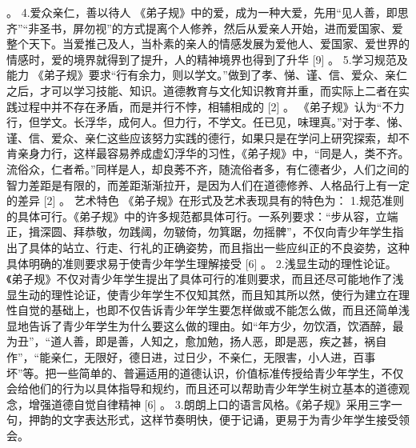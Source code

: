 \documentclass[a4paper,12pt,UTF8,twoside]{ctexbook}
\begin{document}
。
4.爱众亲仁，善以待人
《弟子规》中的爱，成为一种大爱，先用“见人善，即思齐”“非圣书，屏勿视”的方式提离个人修养，然后从爱亲人开始，进而爱国家、爱整个天下。当爱推己及人，当朴素的亲人的情感发展为爱他人、爱国家、爱世界的情感时，爱的境界就得到了提升，人的精神境界也得到了升华 [9]
。
5.学习规范及能力
《弟子规》要求“行有余力，则以学文。”做到了孝、悌、谨、信、爱众、亲仁之后，才可以学习技能、知识。道德教育与文化知识教育并重，而实际上二者在实践过程中并不存在矛盾，而是并行不悖，相辅相成的 [2]
。
《弟子规》认为“不力行，但学文。长浮华，成何人。但力行，不学文。任已见，味理真。”对于孝、悌、谨、信、爱众、亲仁这些应该努力实践的德行，如果只是在学问上研究探索，却不肯亲身力行，这样最容易养成虚幻浮华的习性，《弟子规》中，“同是人，类不齐。流俗众，仁者希。”同样是人，却良莠不齐，随流俗者多，有仁德者少，人们之间的智力差距是有限的，而差距渐渐拉开，是因为人们在道德修养、人格品行上有一定的差异 [2]
。
艺术特色
《弟子规》在形式及艺术表现具有的特色为：
1.规范准则的具体可行。《弟子规》中的许多规范都具体可行。一系列要求：“步从容，立端正，揖深圆、拜恭敬，勿践阈，勿皲倚，勿箕踞，勿摇髀”，不仅向青少年学生指出了具体的站立、行走、行礼的正确姿势，而且指出一些应纠正的不良姿势，这种具体明确的准则要求易于使青少年学生理解接受 [6]
。
2.浅显生动的理性论证。《弟子规》不仅对青少年学生提出了具体可行的准则要求，而且还尽可能地作了浅显生动的理性论证，使青少年学生不仅知其然，而且知其所以然，使行为建立在理性自觉的基础上，也即不仅告诉青少年学生要怎样做或不能怎么做，而且还简单浅显地告诉了青少年学生为什么要这么做的理由。如“年方少，勿饮酒，饮酒醉，最为丑”，“道人善，即是善，人知之，愈加勉，扬人恶，即是恶，疾之甚，祸自作”，“能亲仁，无限好，德日进，过日少，不亲仁，无限害，小人进，百事坏”等。把一些简单的、普遍适用的道德认识，价值标准传授给青少年学生，不仅会给他们的行为以具体指导和规约，而且还可以帮助青少年学生树立基本的道德观念，增强道德自觉自律精神 [6]
。
3.朗朗上口的语言风格。《弟子规》采用三字一句，押韵的文字表达形式，这样节奏明快，便于记诵，更易于为青少年学生接受领会。
\end{document}

